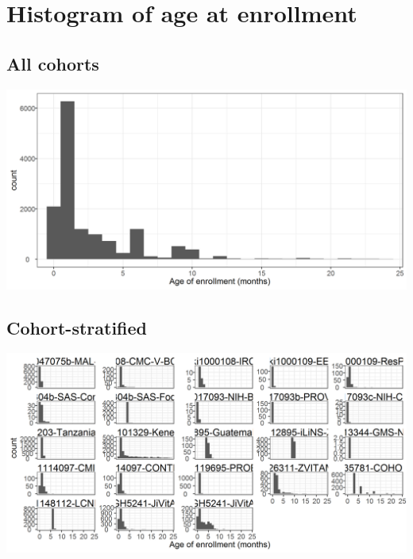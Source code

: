 \documentclass[9pt,]{book}
\begin{document}
\hypertarget{histogram-of-age-at-enrollment}{%
\section{Histogram of age at enrollment}\label{histogram-of-age-at-enrollment}}

\hypertarget{all-cohorts-1}{%
\subsection{All cohorts}\label{all-cohorts-1}}

\includegraphics[width=33.33in]{figure-copies/enrollment_age_histogram_over_7d}

\hypertarget{cohort-stratified-1}{%
\subsection{Cohort-stratified}\label{cohort-stratified-1}}

\includegraphics[width=33.33in]{figure-copies/enrollment_age_histogram_over_7d_cohort}


\end{document}
